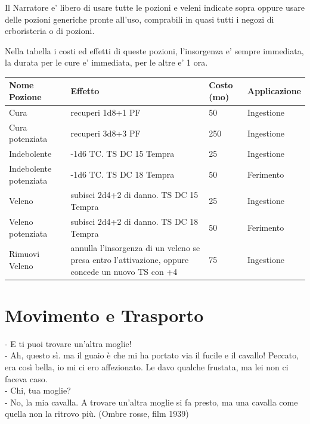 \documentclass[a4paper,11pt,twoside,openany]{book}
\begin{document}
Il Narratore e' libero di usare tutte le pozioni e veleni indicate sopra oppure usare delle pozioni generiche pronte all'uso, comprabili in quasi tutti i negozi di erboristeria o di pozioni.

\medskip

Nella tabella i costi ed effetti di queste pozioni, l'insorgenza e' sempre immediata, la durata per le cure e' immediata, per le altre e' 1 ora.
\bigskip

\begin{tabularx}{0.95\textwidth}{lXll}
	\textbf{Nome Pozione}&  \textbf{Effetto}&  \textbf{Costo (mo)}& \textbf{Applicazione}\\ 
	\toprule
	Cura					& recuperi 1d8+1 PF 							& 50 & Ingestione\\ 
	Cura potenziata			& recuperi 3d8+3 PF 							& 250  & Ingestione\\ 
	Indebolente				& -1d6 TC. TS DC 15 Tempra 						& 25 & Ingestione\\ 
	Indebolente potenziata	& -1d6 TC. TS DC 18 Tempra						& 50 & Ferimento \\ 
	Veleno					& subisci 2d4+2 di danno. TS DC 15 Tempra 		& 25 & Ingestione \\ 
	Veleno potenziata		& subisci 2d4+2 di danno. TS DC 18 Tempra 		& 50 & Ferimento \\ 
	Rimuovi Veleno			& annulla l'insorgenza di un veleno se presa entro l'attivazione, oppure concede un nuovo TS con +4 & 75 & Ingestione\\
\end{tabularx} 



\pagebreak

\section{Movimento e Trasporto}

\label{movimento-e-trasporto}

\begin{tcolorbox}[enhanced,arc=5pt,boxrule=0.3pt]{
	- E ti puoi trovare un'altra moglie!\\
	- Ah, questo sì. ma il guaio è che mi ha portato via il fucile e il cavallo! Peccato, era così bella, io mi ci ero affezionato. Le davo qualche frustata, ma lei non ci faceva caso.\\
	- Chi, tua moglie?\\
	- No, la mia cavalla. A trovare un'altra moglie si fa presto, ma una cavalla come quella non la ritrovo più. (Ombre rosse, film 1939)}\end{tcolorbox}\medskip
\end{document}
